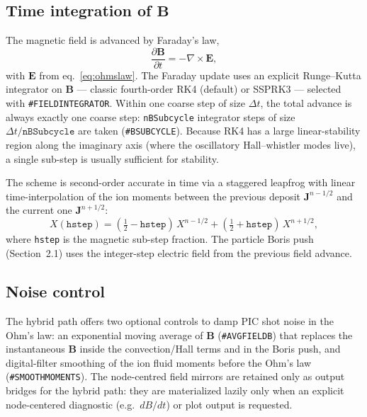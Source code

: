 \documentclass[a4paper, 11pt]{article}
\begin{document}
\subsection{Time integration of $\mathbf{B}$}

The magnetic field is advanced by Faraday's law,
\begin{equation}
\frac{\partial \mathbf{B}}{\partial t} = -\nabla\times\mathbf{E},
\end{equation}
with $\mathbf{E}$ from eq.~\ref{eq:ohmslaw}. The Faraday update uses an explicit Runge--Kutta
integrator on $\mathbf{B}$ --- classic fourth-order RK4 (default) or SSPRK3 --- selected with
\texttt{\#FIELDINTEGRATOR}. Within one coarse step of size $\Delta t$, the total advance is always
exactly one coarse step: \texttt{nBSubcycle} integrator steps of size
$\Delta t/\texttt{nBSubcycle}$ are taken (\texttt{\#BSUBCYCLE}). Because RK4 has a large
linear-stability region along the imaginary axis (where the oscillatory Hall--whistler modes live),
a single sub-step is usually sufficient for stability.

The scheme is second-order accurate in time via a staggered leapfrog with linear
time-interpolation of the ion moments between the previous deposit $\mathbf{J}^{n-1/2}$ and the
current one $\mathbf{J}^{n+1/2}$:
\begin{equation}
X(\texttt{hstep}) = (\tfrac{1}{2}-\texttt{hstep})\,X^{n-1/2}
                  + (\tfrac{1}{2}+\texttt{hstep})\,X^{n+1/2},
\end{equation}
where \texttt{hstep} is the magnetic sub-step fraction. The particle Boris push (Section~2.1)
uses the integer-step electric field from the previous field advance.

\subsection{Noise control}

The hybrid path offers two optional controls to damp PIC shot noise in the Ohm's law:
an exponential moving average of $\mathbf{B}$ (\texttt{\#AVGFIELDB}) that replaces the
instantaneous $\mathbf{B}$ inside the convection/Hall terms and in the Boris push, and
digital-filter smoothing of the ion fluid moments before the Ohm's law (\texttt{\#SMOOTHMOMENTS}).
The node-centred field mirrors are retained only as output bridges for the hybrid path: they are
materialized lazily only when an explicit node-centered diagnostic (e.g.\ $dB/dt$) or plot output
is requested.
\end{document}

